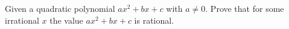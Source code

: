 \problem
Given a quadratic polynomial $a x^2 + b x + c$ with $a \neq 0$.
Prove that for some irrational $x$ the value $a x ^ 2 + b x + c$ is
rational.
\solution
\endproblem
